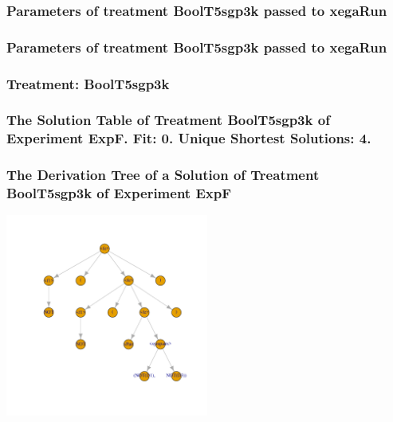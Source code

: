 \documentclass[18pt,c]{beamer}
\begin{document}

 \begin{frame}
 \fontsize{8pt}{9pt}\selectfont
 \frametitle{  Parameters of treatment BoolT5sgp3k passed to xegaRun
 }

 \label{ExpFtParmTable018.tex}  
 \end{frame}


 \begin{frame}
 \fontsize{8pt}{9pt}\selectfont
 \frametitle{  Parameters of treatment BoolT5sgp3k passed to xegaRun
 }

 \label{ExpFtParmTable019.tex}  
 \end{frame}

 \begin{frame}
 \fontsize{8pt}{9pt}\selectfont
 \frametitle{ Treatment: BoolT5sgp3k }

 \label{ExpFStatsTable010.tex}  
 \end{frame}

 \begin{frame}
 \fontsize{8pt}{9pt}\selectfont
 \frametitle{ The Solution Table of Treatment BoolT5sgp3k of Experiment ExpF. Fit: 0. Unique Shortest Solutions: 4. }

 \label{ExpFSolutionTable004.tex}  
 \end{frame}

 \begin{frame}
 \frametitle{ The Derivation Tree of a Solution of Treatment BoolT5sgp3k of Experiment ExpF }
 \begin{center}
\includegraphics[width=0.5\textwidth, angle=0]
{ExpFDerivationTreeFigure004.pdf}
 \end{center}
 \label{report/ExpFDerivationTreeFigure004.pdf}  
 \end{frame}
\end{document}
